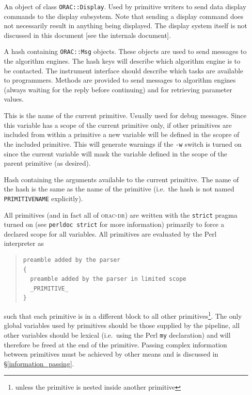 \documentclass[twoside,11pt]{article}
\renewcommand{\_}{\texttt{\symbol{95}}}
\newcommand{\Oracdr}{\textsc{orac-dr}}
\newenvironment{myquote}{\begin{quote}\begin{small}}{\end{small}\end{quote}}
\begin{document}
\begin{description}
An object of class \texttt{ORAC::Display}. Used by primitive writers
to send data display commands to the display subsystem. Note that
sending a display command does not necessarily result in anything
being displayed. The display system itself is not discussed in this document
[see the internals document].

\item[\%Mon] \mbox{}

A hash containing \texttt{ORAC::Msg} objects. These objects are used
to send messages to the algorithm engines. The hash keys will describe 
which algorithm engine is to be contacted. The instrument interface
should describe which tasks are available to programmers. Methods are
provided to send messages to algorithm engines (always waiting for the
reply before continuing) and for retrieving parameter values.

\item[\$ORAC\_PRIMITIVE] \mbox{} %

This is the name of the current primitive. Usually used for debug
messages. Since this variable has a scope of the current primitive
only, if other primitives are included from within a primitive 
a new variable will be defined in the scopre of the included
primitive. This will generate warnings if the \texttt{-w} switch
is turned on since the current variable will mask the variable defined
in the scope of the parent primitive (as desired).


\item[\%\_PRIMITIVE\_NAME\_] \mbox{}

Hash containing the arguments available to the current primitive. The
name of the hash is the same as the name of the primitive (i.e.\ the
hash is not named \texttt{\_PRIMITIVE\_NAME\_} explicitly).

\end{description}

All primitives (and in fact all of \Oracdr) are written with the 
\texttt{strict} pragma turned on (see \texttt{perldoc strict} for more 
information) primarily to force a declared scope for all variables.
All primitives are evaluated by the Perl interpreter as
\begin{myquote}
\begin{verbatim}
preamble added by the parser
{
  preamble added by the parser in limited scope
  _PRIMITIVE_
}
\end{verbatim}
\end{myquote}
such that each primitive is in a different block to all other
primitives\footnote{unless the primitive is nested inside another
primitive}. The only global variables used by primitives should be
those supplied by the pipeline, all other variables should be lexical
(i.e.\ using the Perl \texttt{my} declaration) and will therefore be
freed at the end of the primitive. Passing complex information between 
primitives must be achieved by other means and is discussed in
\S\ref{information_passing}. 
\end{document}
